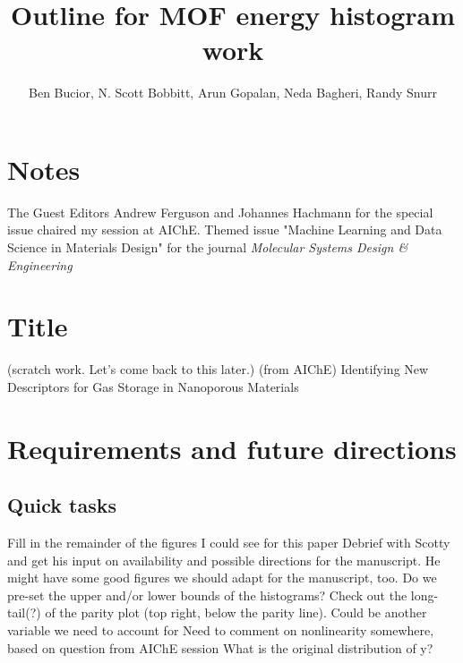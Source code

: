 \documentclass[letterpaper]{article}
\title{Outline for MOF energy histogram work}
\author{Ben Bucior, N. Scott Bobbitt, Arun Gopalan, Neda Bagheri, Randy Snurr}
\begin{document}
\maketitle

%

\section{Notes}
\begin{outline}
	\1 The Guest Editors Andrew Ferguson and Johannes Hachmann for the special issue chaired my session at AIChE.
	\1 Themed issue "Machine Learning and Data Science in Materials Design" for the journal \textit{Molecular Systems Design \& Engineering}
\end{outline}


\section{Title}
\begin{outline}
	\1 (scratch work.  Let's come back to this later.)
	\1 (from AIChE) Identifying New Descriptors for Gas Storage in Nanoporous Materials
\end{outline}

\section{Requirements and future directions}

\subsection{Quick tasks}
\begin{outline}
	\1 Fill in the remainder of the figures I could see for this paper
	\1 Debrief with Scotty and get his input on availability and possible directions for the manuscript.  He might have some good figures we should adapt for the manuscript, too.
	\1 Do we pre-set the upper and/or lower bounds of the histograms?
	\1 Check out the long-tail(?) of the parity plot (top right, below the parity line).  Could be another variable we need to account for
	\1 Need to comment on nonlinearity somewhere, based on question from AIChE session
	\1 What is the original distribution of y?
\end{outline}
\end{document}
